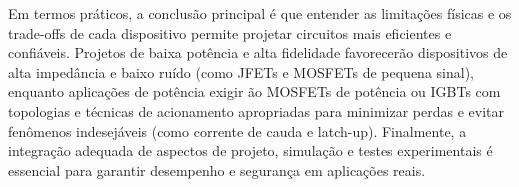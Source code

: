 \documentclass[12pt]{article}
\begin{document}
    Em termos práticos, a conclusão principal é que entender as limitações físicas e os trade-offs de cada dispositivo permite projetar circuitos mais eficientes e confiáveis. Projetos de baixa potência e alta fidelidade favorecerão dispositivos de alta impedância e baixo ruído (como JFETs e MOSFETs de pequena sinal), enquanto aplicações de potência exigir ão MOSFETs de potência ou IGBTs com topologias e técnicas de acionamento apropriadas para minimizar perdas e evitar fenômenos indesejáveis (como corrente de cauda e latch-up). Finalmente, a integração adequada de aspectos de projeto, simulação e testes experimentais é essencial para garantir desempenho e segurança em aplicações reais.

\newpage


\end{document}
